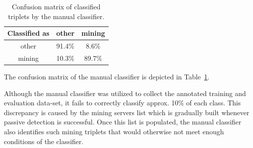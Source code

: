 \documentclass[preprint,12pt,3p]{elsarticle}
\begin{document}
\begin{table}[htp]
 \begin{center}
\begin{tabular}{|c|c|c|}
 \hline
 Classified as & other & mining \\
 \hline
other   & 91.4\% & 8.6\% \\
mining  & 10.3\% & 89.7\% \\
 \hline
 \end{tabular}
 \caption{Confusion matrix of classified triplets by the manual classifier.}
 \label{tab:conf2}
 \end{center}
\end{table}

The confusion matrix of the manual classifier is depicted in Table~\ref{tab:conf2}.

Although the manual classifier was utilized to collect the annotated training and evaluation data-set, it fails to correctly classify approx. 10\% of each class.
This discrepancy is caused by the mining servers list which is gradually built whenever passive detection is successful.
Once this list is populated, the manual classifier also identifies such mining triplets that would otherwise not meet enough conditions of the classifier.

\end{document}
